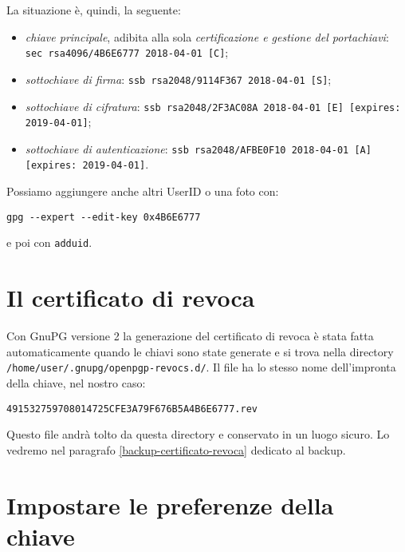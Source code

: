 La situazione è, quindi, la seguente:

\begin{itemize}
    \item \emph{chiave principale}, adibita alla sola \emph{certificazione e
    gestione del portachiavi}: \newline \texttt{sec   rsa4096/4B6E6777 2018-04-01
    [C]};
    \item \emph{sottochiave di firma}: \newline \texttt{ssb   rsa2048/9114F367
    2018-04-01 [S]};
    \item \emph{sottochiave di cifratura}: \newline \texttt{ssb
    rsa2048/2F3AC08A 2018-04-01 [E] [expires: 2019-04-01]};
    \item \emph{sottochiave di autenticazione}: \newline \texttt{ssb
    rsa2048/AFBE0F10 2018-04-01 [A] [expires: 2019-04-01]}.
\end{itemize}

Possiamo aggiungere anche altri UserID o una foto con:

\begin{lstlisting}
gpg --expert --edit-key 0x4B6E6777
\end{lstlisting}

\noindent e poi con \texttt{adduid}.

\section{Il certificato di revoca}
\label{certificato-revoca}

Con GnuPG versione 2 la generazione del certificato di revoca è stata fatta
automaticamente quando le chiavi sono state generate e si trova nella
directory \texttt{/home/user/.gnupg/openpgp-revocs.d/}. Il file ha lo
stesso nome dell'impronta della chiave, nel nostro caso:

\begin{lstlisting}
491532759708014725CFE3A79F676B5A4B6E6777.rev
\end{lstlisting}

Questo file andrà tolto da questa directory e conservato in un luogo sicuro. Lo
vedremo nel paragrafo \vref{backup-certificato-revoca} dedicato al backup.

\section{Impostare le preferenze della chiave}

